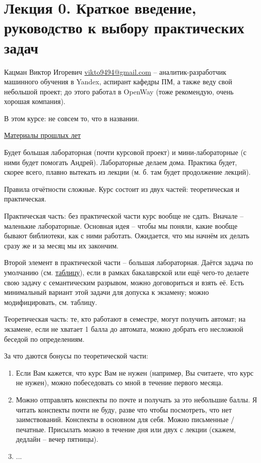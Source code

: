\documentclass[main.tex]{subfiles}
\begin{document}
\setcounter{section}{-1}
\section{Лекция 0. Краткое введение, руководство к выбору практических задач} %

Кацман Виктор Игоревич \href{mailto:vikto9494@gmail.com}{vikto9494@gmail.com} -- аналитик-разработчик машинного обучения в Yandex, аспирант кафедры ПМ, а также веду свой небольшой проект; до этого работал в OpenWay (тоже рекомендую, очень хорошая компания).

В этом курсе: не совсем то, что в названии.

\href{https://drive.google.com/drive/u/0/folders/1gItRk7-yscR5AXBk26G6O33JU7StZNkU}{Материалы прошлых лет}

Будет большая лабораторная (почти курсовой проект) и мини-лабораторные (с ними будет помогать Андрей). Лабораторные делаем дома. Практика будет, скорее всего, плавно вытекать из лекции (м. б. там будет продолжение лекций).

Правила отчётности сложные. Курс состоит из двух частей: теоретическая и практическая.

Практическая часть: без практической части курс вообще не сдать. Вначале -- маленькие лабораторные.
Основная идея -- чтобы мы поняли, какие вообще бывают библиотеки, как с ними работать.
Ожидается, что мы начнём их делать сразу же и за месяц мы их закончим.

Второй элемент в практической части -- большая лабораторная.
Даётся задача по умолчанию (см. \href{https://docs.google.com/spreadsheets/d/1CrtpI9oEBldscjZSrAinBPnJN01S5UECVl5VxgtM_ic/edit#gid=506672535}{таблицу}), если в рамках бакалаврской или ещё чего-то делаете свою задачу с семантическим разрывом, можно договориться и взять её.
Есть минимальный вариант этой задачи для допуска к экзамену; можно модифицировать, см. таблицу.

Теоретическая часть: те, кто работают в семестре, могут получить автомат; на экзамене, если не хватает 1 балла до автомата, можно добрать его несложной беседой по определениям.

За что даются бонусы по теоретической части:

\begin{enumerate}[noitemsep]
    \item Если Вам кажется, что курс Вам не нужен (например, Вы считаете, что курс не нужен), можно побеседовать со мной в течение первого месяца.
    \item Можно отправлять конспекты по почте и получать за это небольшие баллы.
    Я читать конспекты почти не буду, разве что чтобы посмотреть, что нет заимствований.
    Конспекты в основном для себя.
    Можно письменные / печатные.
    Присылать можно в течение дня или двух с лекции (скажем, дедлайн -- вечер пятницы).
    \item ...
\end{enumerate}
\end{document}
